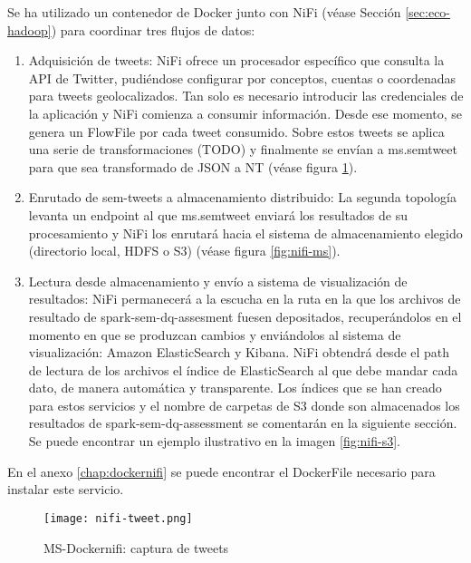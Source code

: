 Se ha utilizado un contenedor de Docker junto con NiFi (véase Sección
\ref{sec:eco-hadoop}) para coordinar tres flujos de datos: 

\begin{enumerate}
\item Adquisición de tweets: NiFi ofrece un procesador específico que consulta
  la \acs{API} de Twitter, pudiéndose configurar por conceptos, cuentas o coordenadas
  para tweets geolocalizados. Tan solo es necesario introducir las credenciales
  de la aplicación y NiFi comienza a consumir información. Desde ese momento, se
  genera un FlowFile por cada tweet consumido. Sobre estos tweets se aplica una
  serie de transformaciones (TODO) y finalmente se envían a ms.semtweet para que
  sea transformado de \acs{JSON} a \acs{NT} (véase figura \ref{fig:nifi-tweet}).
\item Enrutado de sem-tweets a almacenamiento distribuido: La segunda topología
  levanta un endpoint al que ms.semtweet enviará los resultados de su
  procesamiento y NiFi los enrutará hacia el sistema de almacenamiento elegido
  (directorio local, \acs{HDFS} o S3) (véase figura \ref{fig:nifi-ms}). 
\item Lectura desde almacenamiento y envío a sistema de visualización de
  resultados: NiFi permanecerá a la escucha en la ruta en la que los archivos de
  resultado de spark-sem-dq-assesment fuesen depositados, recuperándolos en el
  momento en que se produzcan cambios y enviándolos al sistema de visualización:
  Amazon 
  ElasticSearch y Kibana. NiFi obtendrá desde el path de lectura de los archivos
  el índice de ElasticSearch al que debe mandar cada dato, de manera automática
  y transparente.  Los índices
  que se han creado para estos servicios y el nombre de carpetas de S3 donde son
  almacenados los resultados de spark-sem-dq-assessment se comentarán en la
  siguiente sección. Se puede encontrar un
  ejemplo ilustrativo en la imagen  \ref{fig:nifi-s3}. 
\end{enumerate}

En el anexo \ref{chap:dockernifi} se puede encontrar el DockerFile necesario
para instalar este servicio. 

\begin{figure}[!h]
  \begin{center}
    \texttt{[image: nifi-tweet.png]} 
    \caption{MS-Dockernifi: captura de tweets}
    \label{fig:nifi-tweet}
  \end{center}
\end{figure}

